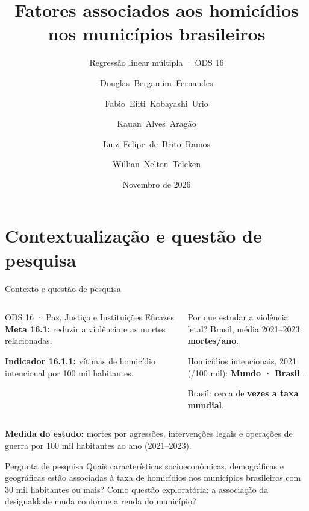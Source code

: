 \documentclass[aspectratio=169,11pt,xcolor=table]{beamer}
\title{Fatores associados aos homicídios nos municípios brasileiros}
\subtitle{Regressão linear múltipla · ODS 16}
\author{\footnotesize Douglas~Bergamim~Fernandes \and Fabio~Eiiti~Kobayashi~Urio \and Kauan~Alves~Aragão \and Luiz~Felipe~de~Brito~Ramos \and Willian~Nelton~Teleken}
\institute{Instituto Tecnológico de Aeronáutica · GED-16 Análise de Regressão}
\date{Novembro de 2026}
\begin{document}
\maketitle

\section{Contextualização e questão de pesquisa}
\begin{frame}{Contexto e questão de pesquisa}
\begin{columns}[T]
\begin{block}{ODS 16 · Paz, Justiça e Instituições Eficazes}
\small
\textbf{Meta 16.1:} reduzir a violência e as mortes relacionadas.
\par\vspace{0.4em}
\textbf{Indicador 16.1.1:} vítimas de homicídio intencional por 100 mil habitantes.
\end{block}
\begin{block}{Por que estudar a violência letal?}
\small
Brasil, média 2021--2023: \textbf{\nHomAno{} mortes/ano}.
\par\vspace{0.4em}
{\footnotesize Homicídios intencionais, 2021 (/100 mil): \textbf{Mundo \nTaxaMundoContexto{} · Brasil \nTaxaBrasilContexto}.}
\par\vspace{0.3em}
Brasil: cerca de \textbf{\nRazaoContexto{} vezes a taxa mundial}.
\end{block}
\end{columns}
\vspace{0.3em}
{\small \textbf{Medida do estudo:} mortes por agressões, intervenções legais e operações de guerra por 100 mil habitantes ao ano (2021--2023).}
\begin{block}{Pergunta de pesquisa}
\small Quais características socioeconômicas, demográficas e geográficas estão associadas à taxa de homicídios nos municípios brasileiros com 30 mil habitantes ou mais? Como questão exploratória: a associação da desigualdade muda conforme a renda do município?
\end{block}
\end{frame}
\end{document}
